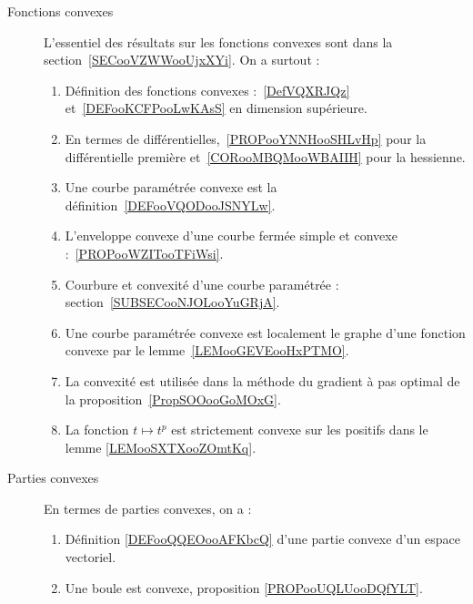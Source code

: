 
\begin{description}
	\item[Fonctions convexes]
	      L'essentiel des résultats sur les fonctions convexes sont dans la section~\ref{SECooVZWWooUjxXYi}. On a surtout :
	      \begin{enumerate}
		      \item
		            Définition des fonctions convexes :~\ref{DefVQXRJQz} et~\ref{DEFooKCFPooLwKAsS} en dimension supérieure.
		      \item
		            En termes de différentielles,~\ref{PROPooYNNHooSHLvHp} pour la différentielle première et~\ref{CORooMBQMooWBAIIH} pour la hessienne.
		      \item
		            Une courbe paramétrée convexe est la définition~\ref{DEFooVQODooJSNYLw}.
		      \item
		            L'enveloppe convexe d'une courbe fermée simple et convexe :~\ref{PROPooWZITooTFiWsi}.
		      \item
		            Courbure et convexité d'une courbe paramétrée : section~\ref{SUBSECooNJOLooYuGRjA}.
		      \item
		            Une courbe paramétrée convexe est localement le graphe d'une fonction convexe par le lemme~\ref{LEMooGEVEooHxPTMO}.
		      \item
		            La convexité est utilisée dans la méthode du gradient à pas optimal de la proposition~\ref{PropSOOooGoMOxG}.
		      \item
		            La fonction \( t\mapsto t^p\) est strictement convexe sur les positifs dans le lemme \ref{LEMooSXTXooZOmtKq}.
	      \end{enumerate}
	\item[Parties convexes]

	      En termes de parties convexes, on a :
	      \begin{enumerate}
		      \item
		            Définition \ref{DEFooQQEOooAFKbcQ} d'une partie convexe d'un espace vectoriel.
		      \item
		            Une boule est convexe, proposition \ref{PROPooUQLUooDQfYLT}.
	      \end{enumerate}
\end{description}

